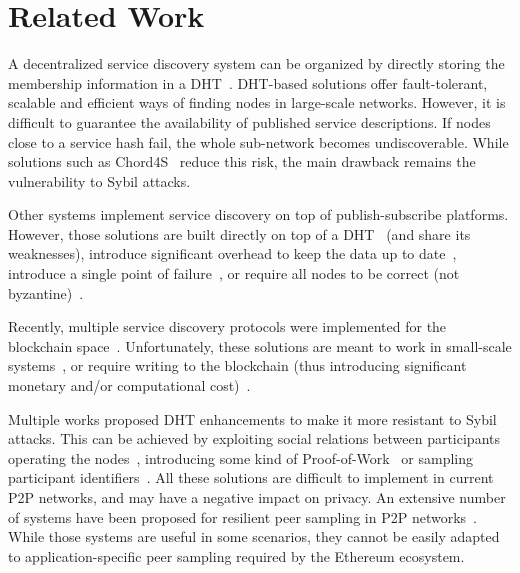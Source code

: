 
\vspace{-5mm}
\section{Related Work}
\label{sec:related}
\vspace{-2mm}

 

A decentralized service discovery system can be organized by directly storing the membership information in a DHT~\cite{can,chord,rowstron2001pastry,maymounkov2002kademlia}. 
DHT-based solutions offer fault-tolerant, scalable and efficient ways of finding nodes in large-scale networks.
However, it is difficult to guarantee the availability of published service descriptions.
If nodes close to a service hash fail, the whole sub-network becomes undiscoverable. 
While solutions such as Chord4S~\cite{chord4s} reduce this risk, the main drawback remains the vulnerability to Sybil attacks.

Other systems implement service discovery on top of publish-subscribe platforms.
However, those solutions are built directly on top of a DHT~\cite{scribe,poldercast,banno2015} (and share its weaknesses), introduce significant overhead to keep the data up to date~\cite{gossipsub}, introduce a single point of failure~\cite{dan2012centralized}, or require all nodes to be correct (\ie not byzantine)~\cite{baldoni2007tera}.

Recently, multiple service discovery protocols were implemented for the blockchain space~\cite{farmer2021decentralized, manevich2019endorsement, keizer2021flock}.
Unfortunately, these solutions are meant to work in small-scale systems~\cite{farmer2021decentralized}, or require writing to the blockchain (thus introducing significant monetary and/or computational cost)~\cite{manevich2019endorsement, keizer2021flock}. 

Multiple works proposed DHT enhancements to make it more resistant to Sybil attacks.
This can be achieved by exploiting social relations between participants operating the nodes~\cite{danezis2005sybil, danezis2009sybilinfer}, introducing some kind of Proof-of-Work~\cite{skad} or sampling participant identifiers~\cite{cholez2010efficient}.
All these solutions are difficult to implement in current P2P networks, and may have a negative impact on privacy.
An extensive number of systems have been proposed for resilient peer sampling in P2P networks~\cite{bortnikov2009brahms, jelasity2007gossip, ouguz2014stable, pigaglio2022raptee}.
While those systems are useful in some scenarios, they cannot be easily adapted to application-specific peer sampling required by the Ethereum ecosystem.

